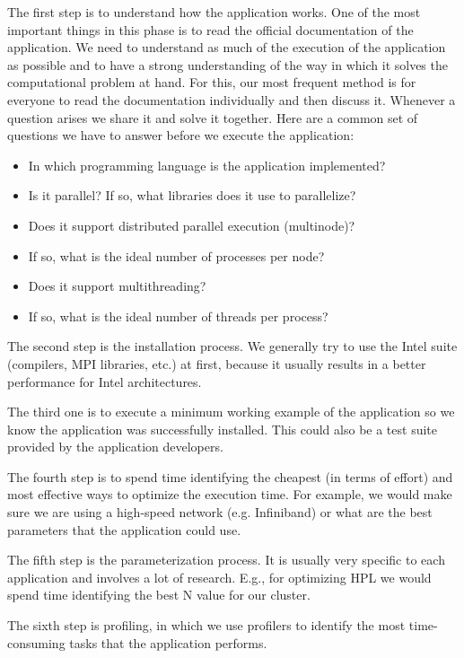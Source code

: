 \documentclass[11pt,a4paper,twocolumn]{article}
\begin{document}
The first step is to understand how the application works. One of the most important things in this phase is to read the official documentation of the application. We need to understand as much of the execution of the application as possible and to have a strong understanding of the way in which it solves the computational problem at hand. For this, our most frequent method is for everyone to read the documentation individually and then discuss it. Whenever a question arises we share it and solve it together. Here are a common set of questions we have to answer before we execute the application:
\begin{itemize}
    \item In which programming language is the application implemented?
    \item Is it parallel? If so, what libraries does it use to parallelize?
    \item Does it support distributed parallel execution (multinode)?
    \item If so, what is the ideal number of processes per node?
    \item Does it support multithreading?
    \item If so, what is the ideal number of threads per process?
\end{itemize}

The second step is the installation process. We generally try to use the Intel suite (compilers, MPI libraries, etc.) at first, because it usually results in a better performance for Intel architectures.

The third one is to execute a minimum working example of the application so we know the application was successfully installed. This could also be a test suite provided by the application developers.

The fourth step is to spend time identifying the cheapest (in terms of effort) and most effective ways to optimize the execution time. For example, we would make sure we are using a high-speed network (e.g. Infiniband) or what are the best parameters that the application could use.

The fifth step is the parameterization process. It is usually very specific to each application and involves a lot of research. E.g., for optimizing HPL we would spend time identifying the best N value for our cluster.

The sixth step is profiling, in which we use profilers to identify the most time-consuming tasks that the application performs.
\end{document}
